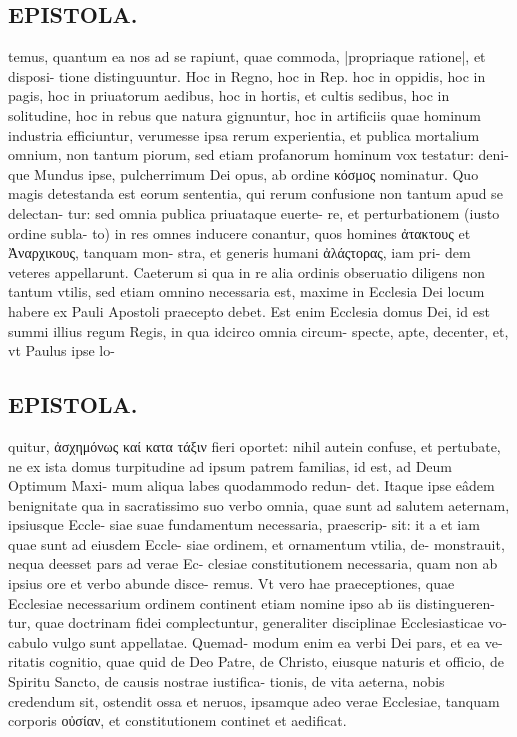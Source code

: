 \documentclass{article}
\begin{document}
\begin{pages}
\section*{EPISTOLA. }\pstart temus, quantum ea nos ad se rapiunt, quae commoda, |propriaque ratione|, et disposi- tione distinguuntur. Hoc in Regno, hoc in Rep. hoc in oppidis, hoc in pagis, hoc in priuatorum aedibus, hoc in hortis, et cultis sedibus, hoc in solitudine, hoc in rebus que natura gignuntur, hoc in artificiis quae hominum industria efficiuntur, verumesse ipsa rerum experientia, et publica mortalium omnium, non tantum piorum, sed etiam profanorum hominum vox testatur: deni- que Mundus ipse, pulcherrimum Dei opus, ab ordine κόσμος nominatur. Quo magis detestanda est eorum sententia, qui rerum confusione non tantum apud se delectan- tur: sed omnia publica priuataque euerte- re, et perturbationem (iusto ordine subla- to) in res omnes inducere conantur, quos homines ἀτακτους et Ἀναρχικους, tanquam mon- stra, et generis humani ἀλάςτορας, iam pri- dem veteres appellarunt. Caeterum si qua in re alia ordinis obseruatio diligens non tantum vtilis, sed etiam omnino necessaria est, maxime in Ecclesia Dei locum habere ex Pauli Apostoli praecepto debet. Est enim Ecclesia domus Dei, id est summi illius regum Regis, in qua idcirco omnia circum- specte, apte, decenter, et, vt Paulus ipse lo-  \pend
\subsection*{EPISTOLA. }\pstart quitur, ἀσχημόνως καί κατα τάξιν fieri oportet: nihil autein confuse, et pertubate, ne ex ista domus turpitudine ad ipsum patrem familias, id est, ad Deum Optimum Maxi- mum aliqua labes quodammodo redun- det. Itaque ipse eâdem benignitate qua in sacratissimo suo verbo omnia, quae sunt ad salutem aeternam, ipsiusque Eccle- siae suae fundamentum necessaria, praescrip- sit: it a et iam quae sunt ad eiusdem Eccle- siae ordinem, et ornamentum vtilia, de- monstrauit, nequa deesset pars ad verae Ec- clesiae constitutionem necessaria, quam non ab ipsius ore et verbo abunde disce- remus. Vt vero hae praeceptiones, quae Ecclesiae necessarium ordinem continent etiam nomine ipso ab iis distingueren- tur, quae doctrinam fidei complectuntur, generaliter disciplinae Ecclesiasticae vo- cabulo vulgo sunt appellatae. Quemad- modum enim ea verbi Dei pars, et ea ve- ritatis cognitio, quae quid de Deo Patre, de Christo, eiusque naturis et officio, de Spiritu Sancto, de causis nostrae iustifica- tionis, de vita aeterna, nobis credendum sit, ostendit ossa et neruos, ipsamque adeo verae Ecclesiae, tanquam corporis οὐσίαν, et constitutionem continet et aedificat.  \pend

\end{pages}
\end{document}
